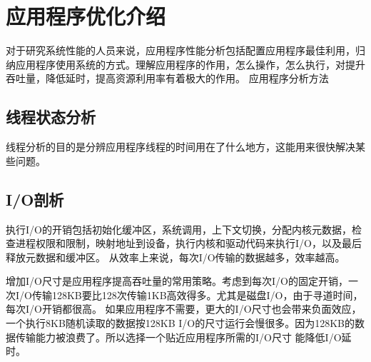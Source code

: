 \chapter{应用程序优化介绍}


对于研究系统性能的人员来说，应用程序性能分析包括配置应用程序最佳利用，归纳应用程序使用系统的方式。理解应用程序的作用，怎么操作，怎么执行，对提升吞吐量，降低延时，提高资源利用率有着极大的作用。
应用程序分析方法

\section{线程状态分析}
线程分析的目的是分辨应用程序线程的时间用在了什么地方，这能用来很快解决某些问题。

\section{I/O剖析}

执行I/O的开销包括初始化缓冲区，系统调用，上下文切换，分配内核元数据，检查进程权限和限制，映射地址到设备，执行内核和驱动代码来执行I/O，以及最后 释放元数据和缓冲区。
从效率上来说，每次I/O传输的数据越多，效率越高。

  增加I/O尺寸是应用程序提高吞吐量的常用策略。考虑到每次I/O的固定开销，一次I/O传输128KB要比128次传输1KB高效得多。尤其是磁盘I/O，由于寻道时间，每次I/O开销都很高。
如果应用程序不需要，更大的I/O尺寸也会带来负面效应，一个执行8KB随机读取的数据按128KB I/O的尺寸运行会慢很多。因为128KB的数据传输能力被浪费了。所以选择一个贴近应用程序所需的I/O尺寸
能降低I/O延时。
